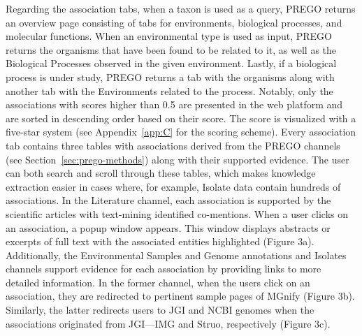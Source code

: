    Regarding the association tabs, when a taxon is used as a query, PREGO returns an overview page consisting of tabs for environments, biological processes, and molecular functions. When an environmental type is used as input, PREGO returns the organisms that have been found to be related to it, as well as the Biological Processes observed in the given environment. 
   Lastly, if a biological process is under study, PREGO returns a tab with the organisms along with another tab with the Environments related to the process. Notably, only the associations with scores higher than 0.5 are presented in the web platform and are sorted in descending order based on their score. The score is visualized with a five-star system (see Appendix~\ref{app:C} for the scoring scheme).
   Every association tab contains three tables with associations derived from the PREGO channels (see Section~\ref{sec:prego-methods}) along with their supported evidence. The user can both search and scroll through these tables, which makes knowledge extraction easier in cases where, for example, Isolate data contain hundreds of associations. In the Literature channel, each association is supported by the scientific articles with text-mining identified co-mentions. When a user clicks on an association, a popup window appears. This window displays abstracts or excerpts of full text with the associated entities highlighted (Figure 3a). Additionally, the Environmental Samples and Genome annotations and Isolates channels support evidence for each association by providing links to more detailed information. In the former channel, when the users click on an association, they are redirected to pertinent sample pages of MGnify (Figure 3b). Similarly, the latter redirects users to JGI and NCBI genomes when the associations originated from JGI—IMG and Struo, respectively (Figure 3c).


